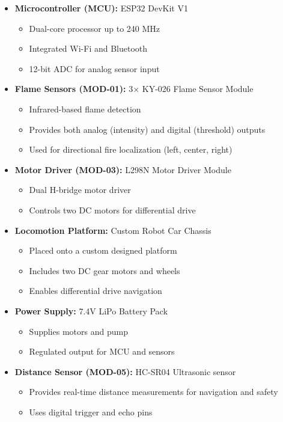 \documentclass[12pt]{article}
\begin{document}
\begin{itemize}
    \item \textbf{Microcontroller (MCU):} ESP32 DevKit V1
    \begin{itemize}
        \item Dual-core processor up to 240 MHz
        \item Integrated Wi-Fi and Bluetooth
        \item 12-bit ADC for analog sensor input
    \end{itemize}

    \item \textbf{Flame Sensors (MOD-01):} 3× KY-026 Flame Sensor Module
    \begin{itemize}
        \item Infrared-based flame detection
        \item Provides both analog (intensity) and digital (threshold) outputs
        \item Used for directional fire localization (left, center, right)
    \end{itemize}

    \item \textbf{Motor Driver (MOD-03):} L298N Motor Driver Module
    \begin{itemize}
        \item Dual H-bridge motor driver
        \item Controls two DC motors for differential drive
    \end{itemize}

    \item \textbf{Locomotion Platform:} Custom Robot Car Chassis
    \begin{itemize}
        \item Placed onto a custom designed platform
        \item Includes two DC gear motors and wheels
        \item Enables differential drive navigation
    \end{itemize}

    \item \textbf{Power Supply:} 7.4V LiPo Battery Pack
    \begin{itemize}
        \item Supplies motors and pump
        \item Regulated output for MCU and sensors
    \end{itemize}
    \item \textbf{Distance Sensor (MOD-05):} HC-SR04 Ultrasonic sensor
    \begin{itemize}
        \item Provides real-time distance measurements for navigation and safety
        \item Uses digital trigger and echo pins
    \end{itemize}


\end{itemize}
\end{document}
